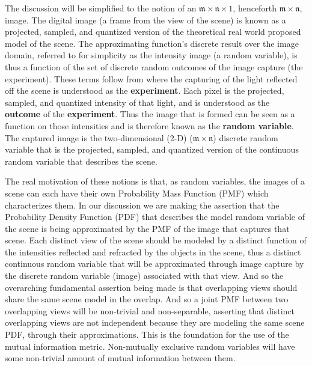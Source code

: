 The discussion will be simplified to the notion of an $\mathfrak{m} \times \mathfrak{n} \times 1$, henceforth $\mathfrak{m} \times \mathfrak{n}$, image. The digital image (a frame from the view of the scene) is known as a projected, sampled, and quantized version of the theoretical real world proposed model of the scene. The approximating function's discrete result over the image domain, referred to for simplicity as the intensity image (a random variable), is thus a function of the set of discrete random outcomes of the image capture (the experiment). These terms follow from \cite{Papoulis2002} where the capturing of the light reflected off the scene is understood as the \textbf{experiment}. Each pixel is the projected, sampled, and quantized intensity of that light, and is understood as the \textbf{outcome} of the \textbf{experiment}. Thus the image that is formed can be seen as a function on those intensities and is therefore known as the \textbf{random variable}. The captured image is the two-dimensional (2-D) ($\mathfrak{m}\times\mathfrak{n}$) discrete random variable that is the projected, sampled, and quantized version of the continuous random variable that describes the scene.

The real motivation of these notions is that, as random variables, the images of a scene can each have their own Probability Mass Function (PMF) \cite{Papoulis2002} which characterizes them. In our discussion we are making the assertion that the Probability Density Function (PDF) that describes the model random variable of the scene is being approximated by the PMF of the image that captures that scene. Each distinct view of the scene should be modeled by a distinct function of the intensities reflected and refracted by the objects in the scene, thus a distinct continuous random variable that will be approximated through image capture by the discrete random variable (image) associated with that view. And so the overarching fundamental assertion being made is that overlapping views should share the same scene model in the overlap. And so a joint PMF between two overlapping views will be non-trivial and non-separable, asserting that distinct overlapping views are not independent because they are modeling the same scene PDF, through their approximations. This is the foundation for the use of the mutual information metric. Non-mutually exclusive random variables will have some non-trivial amount of mutual information between them.

